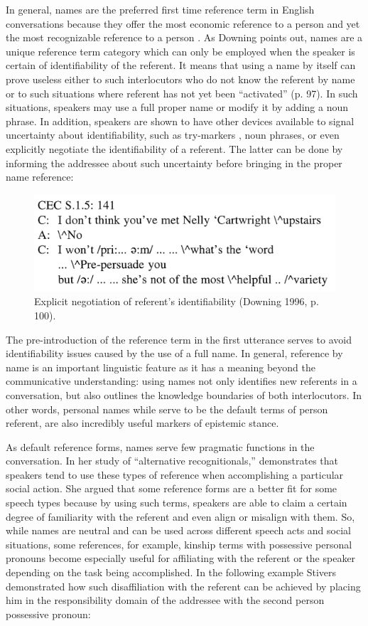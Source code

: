 \documentclass[12pt]{article}
\begin{document}
In general, names are the preferred first time reference term in English conversations because they offer the most economic reference to a person and yet the most recognizable reference to a person \parencite{downing1996}. As Downing points out, names are a unique reference term category which can only be employed when the speaker is certain of identifiability of the referent. It means that using a name by itself can prove useless either to such interlocutors who do not know the referent by name or to such situations where referent has not yet been ``activated'' (p. 97). In such situations, speakers may use a full proper name or modify it by adding a noun phrase. In addition, speakers are shown to have other devices available to signal uncertainty about identifiability, such as try-markers \parencite{sacks1979}, noun phrases, or even explicitly negotiate the identifiability of a referent. The latter can be done by informing the addressee about such uncertainty before bringing in the proper name reference:

\begin{figure}
\caption{Explicit negotiation of referent's identifiability (Downing 1996, p. 100).}
\label{Downing}
\includegraphics[width=5in]{Downing.png}
\end{figure}

The pre-introduction of the reference term in the first utterance serves to avoid identifiability issues caused by the use of a full name. In general, reference by name is an important linguistic feature as it has a meaning beyond the communicative understanding: using names not only identifies new referents in a conversation, but also outlines the knowledge boundaries of both interlocutors. In other words, personal names while serve to be the default terms of person referent, are also incredibly useful markers of epistemic stance.

As default reference forms, names serve few pragmatic functions in the conversation. In her study of ``alternative recognitionals,'' \textcite{stivers2007} demonstrates that speakers tend to use these types of reference when accomplishing a particular social action. She argued that some reference forms are a better fit for some speech types because by using such terms, speakers are able to claim a certain degree of familiarity with the referent and even align or misalign with them. So, while names are neutral and can be used across different speech acts and social situations, some references, for example, kinship terms with possessive personal pronouns become especially useful for affiliating with the referent or the speaker depending on the task being accomplished. In the following example Stivers demonstrated how such disaffiliation with the referent can be achieved by placing him in the responsibility domain of the addressee with the second person possessive pronoun:
\end{document}
